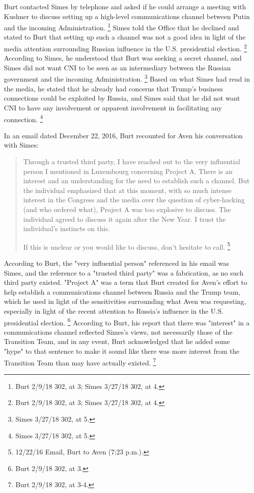 Burt contacted Simes by telephone and asked if he could arrange a meeting with Kushner to discuss setting up a high-level communications channel between Putin and the incoming Administration.%
\footnote{Burt 2/9/18 302, at 3;
Simes 3/27/18 302, at 4.}
Simes told the Office that he declined and stated to Burt that setting up such a channel was not a good idea in light of the media attention surrounding Russian influence in the U.S. presidential election.%
\footnote{Burt 2/9/18 302, at 3;
Simes 3/27/18 302, at 4.}
According to Simes, he understood that Burt was seeking a secret channel, and Simes did not want CNI to be seen as an intermediary between the Russian government and the incoming Administration.%
\footnote{Simes 3/27/18 302, at 5.}
Based on what Simes had read in the media, he stated that he already had concerns that Trump's business connections could be exploited by Russia, and Simes said that he did not want CNI to have any involvement or apparent involvement in facilitating any connection.%
\footnote{Simes 3/27/18 302, at 5.}

In an email dated December 22, 2016, Burt recounted for Aven his conversation with Simes:

\begin{quote}
Through a trusted third party, I have reached out to the very influential person I mentioned in Luxembourg concerning Project A.
There is an interest and an understanding for the need to establish such a channel.
But the individual emphasized that at this moment, with so much intense interest in the Congress and the media over the question of cyber-hacking (and who ordered what), Project A was too explosive to discuss.
The individual agreed to discuss it again after the New Year.
I trust the individual's instincts on this.

If this is unclear or you would like to discuss, don't hesitate to call.%
\footnote{12/22/16 Email, Burt to Aven (7:23 p.m.).}
\end{quote}

According to Burt, the "very influential person" referenced in his email was Simes, and the reference to a "trusted third party" was a fabrication, as no such third party existed.
"Project A" was a term that Burt created for Aven's effort to help establish a communications channel between Russia and the Trump team, which he used in light of the sensitivities surrounding what Aven was requesting, especially in light of the recent attention to Russia's influence in the U.S. presidential election.%
\footnote{Burt 2/9/18 302, at 3.}
According to Burt, his report that there was "interest" in a communications channel reflected Simes's views, not necessarily those of the Transition Team, and in any event, Burt acknowledged that he added some "hype" to that sentence to make it sound like there was more interest from the Transition Team than may have actually existed.%
\footnote{Burt 2/9/18 302, at 3-4.}

